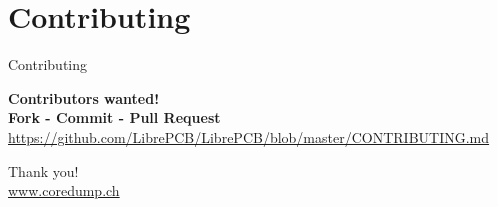 \documentclass[aspectratio=1610,t]{beamer}
\begin{document}

\section{Contributing}

\begin{frame}{Contributing}
  \begin{centering}
    \bigskip \bigskip
    \textbf{\Huge Contributors wanted!}\\
    \bigskip \bigskip
    \textbf{\Large Fork - Commit - Pull Request}\\
    \bigskip \bigskip
    {\small \url{https://github.com/LibrePCB/LibrePCB/blob/master/CONTRIBUTING.md}}\\
  \end{centering}
\end{frame}


{
\begin{frame}[standout]
	\begin{centering}
	{\Huge Thank you!}\\
	{\normalsize \url{www.coredump.ch}}\\
	\end{centering}
\end{frame}
}
\end{document}
